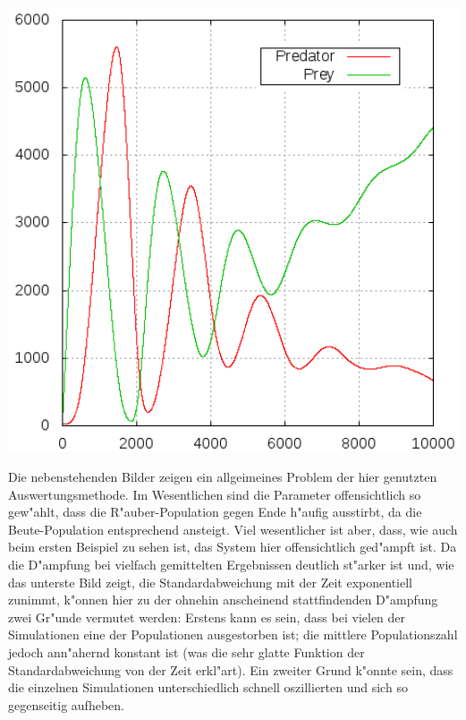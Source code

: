 \documentclass[11pt]{article}
\begin{document}
\begin{minipage}[b]{0.58\textwidth}
\includegraphics[width=1.0\textwidth]{Graphiken/ppm45pop.png}
\end{minipage}
\begin{minipage}[b]{0.39\textwidth}
Die nebenstehenden Bilder zeigen ein allgeimeines Problem der hier genutzten Auswertungsmethode. Im Wesentlichen sind die Parameter offensichtlich so gew"ahlt, dass die R"auber-Population gegen Ende h"aufig ausstirbt, da die Beute-Population entsprechend ansteigt. Viel wesentlicher ist aber, dass, wie auch beim ersten Beispiel zu sehen ist, das System hier offensichtlich ged"ampft ist. Da die D"ampfung bei vielfach gemittelten Ergebnissen deutlich st"arker ist und, wie das unterste Bild zeigt, die Standardabweichung mit der Zeit exponentiell zunimmt, k"onnen hier zu der ohnehin anscheinend stattfindenden D"ampfung zwei Gr"unde vermutet werden: Erstens kann es sein, dass bei vielen der Simulationen eine der Populationen ausgestorben ist; die mittlere Populationszahl jedoch ann"ahernd konstant ist (was die sehr glatte Funktion der Standardabweichung von der Zeit erkl"art). Ein zweiter Grund k"onnte sein, dass die einzelnen Simulationen unterschiedlich schnell oszillierten und sich so gegenseitig aufheben.
\end{minipage}
\end{document}
